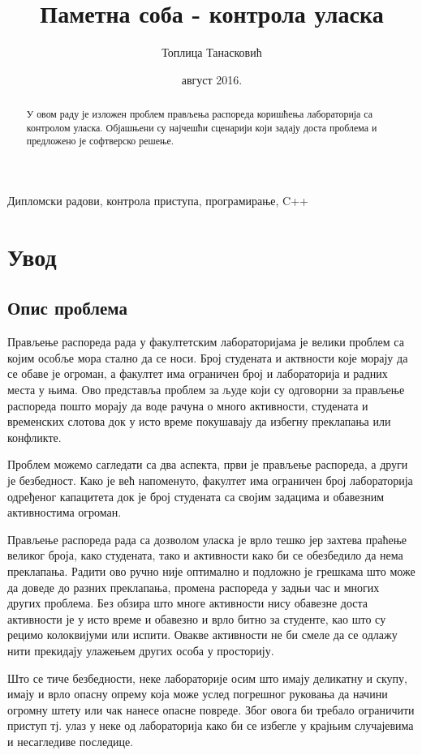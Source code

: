 \documentclass[a4paper, 12pt, diplomski]{etfcyr}
\title{Паметна соба - контрола уласка}
\author{Топлица Танасковић}
\date{август 2016.}
\renewenvironment{justify}{%
	\trivlist
	\justifying
	\itemindent\JustifyingParindent
	\item\relax
}{%
\endtrivlist
}
\begin{document}
	\sloppy
	\maketitle
	\begin{abstract}
		\begin{justify}
			У овом раду је изложен проблем прављења распореда коришћења лабораторија са контролом уласка. Објашњени су најчешћи сценарији који задају доста проблема и предложено је софтверско решење.
		\end{justify}
	\end{abstract}

	\begin{keywords}
		Дипломски радови, контрола приступа, програмирање, C++
	\end{keywords}
	\tableofcontents
	\listoffigures
	\listoftables

	\chapter{Увод}
		
		\section{Опис проблема}
		
		\begin{justify}
			Прављење распореда рада у факултетским лабораторијама је велики проблем са којим особље мора стално да се носи. Број студената и актвности које морају да се обаве је огроман, а факултет има ограничен број и лабораторија и радних места у њима. Ово представља проблем за људе који су одговорни за прављење распореда пошто морају да воде рачуна о много активности, студената и временских слотова док у исто време покушавају да избегну преклапања или конфликте.
		
			Проблем можемо сагледати са два аспекта, први је прављење распореда, а други је безбедност. Како је већ напоменуто, факултет има ограничен број лабораторија одређеног капацитета док је број студената са својим задацима и обавезним активностима огроман.
		
			Прављење распореда рада са дозволом уласка је врло тешко јер захтева праћење великог броја, како студената, тако и активности како би се обезбедило да нема преклапања. Радити ово ручно није оптимално и подложно је грешкама што може да доведе до разних преклапања, промена распореда у задњи час и многих других проблема. Без обзира што многе активности нису обавезне доста активности је у исто време и обавезно и врло битно за студенте, као што су рецимо колоквијуми или испити. Овакве активности не би смеле да се одлажу нити прекидају улажењем других особа у просторију.
		
			Што се тиче безбедности, неке лабораторије осим што имају деликатну и скупу, имају и врло опасну опрему која може услед погрешног руковања да начини огромну штету или чак нанесе опасне повреде. Због овога би требало ограничити приступ тј. улаз у неке од лабораторија како би се избегле у крајњим случајевима и несагледиве последице.
		\end{justify}
\end{document}

